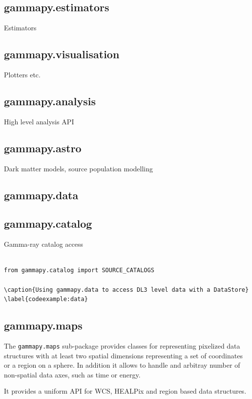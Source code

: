 \subsection{gammapy.estimators}
Estimators

\subsection{gammapy.visualisation}
Plotters etc.

\subsection{gammapy.analysis}
High level analysis API

\subsection{gammapy.astro}
Dark matter models, source population modelling

\subsection{gammapy.data}

\subsection{gammapy.catalog}
Gamma-ray catalog access

\begin{lstlisting}

from gammapy.catalog import SOURCE_CATALOGS

\caption{Using gammapy.data to access DL3 level data with a DataStore}
\label{codeexample:data}
\end{lstlisting}


\subsection{gammapy.maps}
The \verb|gammapy.maps| sub-package provides classes for representing pixelized
data structures with at least two spatial dimensions representing a set of
coordinates or a region on a sphere. In addition it allows to handle and arbitray
number of non-spatial data axes, such as time or energy.

It provides a uniform API for WCS, HEALPix and region based data structures.

